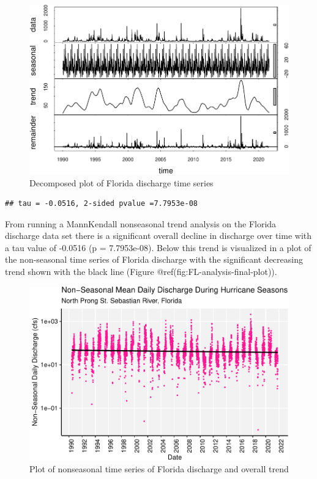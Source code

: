 \documentclass[
  12pt,
]{article}
\begin{document}
\begin{figure}

{\centering \includegraphics{BoosBrantleyHusted_ENV872_Project_files/figure-latex/FL-analysis-time-series-1} 

}

\caption{Decomposed plot of Florida discharge time series}\label{fig:FL-analysis-time-series}
\end{figure}

\begin{verbatim}
## tau = -0.0516, 2-sided pvalue =7.7953e-08
\end{verbatim}

From running a MannKendall nonseasonal trend analysis on the Florida
discharge data set there is a significant overall decline in discharge
over time with a tau value of -0.0516 (p = 7.7953e-08). Below this trend
is visualized in a plot of the non-seasonal time series of Florida
discharge with the significant decreasing trend shown with the black
line (Figure @ref(fig:FL-analysis-final-plot)).

\begin{figure}

{\centering \includegraphics{BoosBrantleyHusted_ENV872_Project_files/figure-latex/FL-analysis-final-plot-1} 

}

\caption{Plot of nonseasonal time series of Florida discharge and overall trend}\label{fig:FL-analysis-final-plot}
\end{figure}
\end{document}
